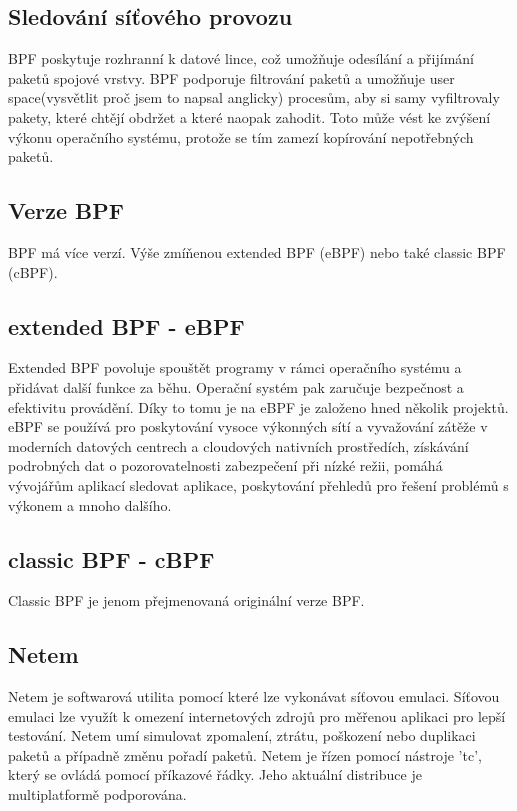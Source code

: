 \subsection*{Sledování síťového provozu}
BPF poskytuje rozhranní k datové lince, což umožňuje odesílání a přijímání paketů spojové vrstvy. BPF podporuje filtrování paketů a umožňuje user space(vysvětlit proč jsem to napsal anglicky) procesům,
aby si samy vyfiltrovaly pakety, které chtějí obdržet a které naopak zahodit. Toto může vést ke zvýšení výkonu operačního systému, protože se tím zamezí kopírování nepotřebných paketů.

\subsection*{Verze BPF}
BPF má více verzí. Výše zmíňenou extended BPF (eBPF) nebo také classic BPF (cBPF).

\subsection*{extended BPF - eBPF}
Extended BPF povoluje spouštět programy v rámci operačního systému a přidávat další funkce za běhu.
Operační systém pak zaručuje bezpečnost a efektivitu provádění. Díky to tomu je na eBPF je založeno hned několik projektů.
eBPF se používá pro  poskytování vysoce výkonných sítí a vyvažování zátěže v moderních datových centrech a cloudových nativních prostředích,
získávání podrobných dat o pozorovatelnosti zabezpečení při nízké režii, pomáhá vývojářům aplikací sledovat aplikace,
poskytování přehledů pro řešení problémů s výkonem a mnoho dalšího.

\subsection*{classic BPF - cBPF}
Classic BPF je jenom přejmenovaná originální verze BPF.

\subsection{Netem}
Netem\cite{Netem} je softwarová utilita pomocí které lze vykonávat síťovou emulaci. Síťovou emulaci lze využít k omezení internetových zdrojů pro měřenou aplikaci pro lepší testování.
Netem umí simulovat zpomalení, ztrátu, poškození nebo duplikaci paketů a případně změnu pořadí paketů. Netem je řízen pomocí nástroje 'tc', který se ovládá pomocí příkazové řádky.
Jeho aktuální distribuce je multiplatformě podporována.

